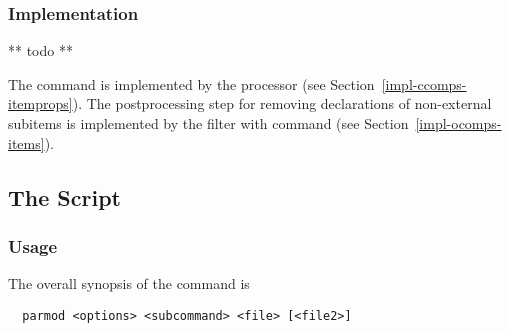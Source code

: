 \subsubsection{Implementation}

** todo **

The  command is implemented by the processor  (see Section~\ref{impl-ccomps-itemprops}). 
The postprocessing step for removing declarations of non-external subitems is implemented by the filter
 with command  (see Section~\ref{impl-ocomps-items}).

\subsection{The  Script}
\label{impl-all-parmod}

\subsubsection{Usage}

The overall synopsis of the  command is
\begin{verbatim}
  parmod <options> <subcommand> <file> [<file2>]
\end{verbatim}

